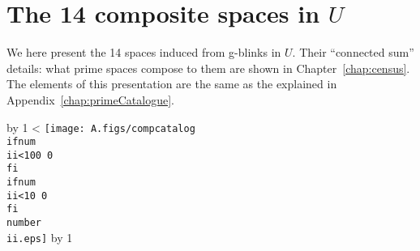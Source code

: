 \chapter{The 14 composite spaces in $U$}
\label{chap:compositeCatalogue}

We here present the 14 spaces induced from g-blinks in $U$.
Their ``connected sum'' details: what prime spaces compose to
them are shown in Chapter~\ref{chap:census}. The elements of
this presentation are the same as the explained in
Appendix~\ref{chap:primeCatalogue}.

\newcount\ii \newcount\jj   %
\def\producePagesTwo#1#2{
\ii=#1                      %
\jj=#2                      %
\advance\jj by 1            %
\loop   %
   \ifnum\ii<\jj
{
   \hspace{-1.8cm}
   \enlargethispage{5cm}
   {\centering
   \texttt{[image: A.figs/compcatalog\\ifnum\\ii<100 0\\fi\\ifnum\\ii<10 0\\fi\\number\\ii.eps]}
   }
   \newpage}
      \advance\ii by 1
   \repeat
}

\newpage
\setlength{\topmargin}{-1.2cm}

\producePagesTwo{1}{3} 
